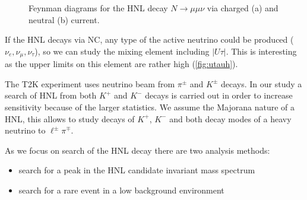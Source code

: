 \documentclass[../main.tex]{subfiles}
\begin{document}
\begin{figure}[!ht]
    \begin{minipage}[!ht]{0.49\linewidth}
    \end{minipage}
    \hfill
    \begin{minipage}[!ht]{0.49\linewidth}
    \end{minipage}
    \caption{Feynman diagrams for the HNL decay $N\to\mu\mu\nu$ via charged (a) and neutral (b) current.}
    \label{fig:DimuonFeynman}
\end{figure}

If the HNL decays via NC, any type of the active neutrino could be produced ($\nu_{e}, \nu_{\mu}, \nu_{\tau}$), so we can study the mixing element including $|U\tau|$. This is interesting as the upper limits on this element are rather high (\autoref{fig:utauh}).

The T2K experiment uses neutrino beam from $\pi^\pm$ and $K^\pm$ decays. In our study a search of HNL from both $K^+$ and $K^-$ decays is carried out in order to increase sensitivity because of the larger statistics. We assume the Majorana nature of a HNL, this allows to study decays of $K^+$, $K^-$ and both decay modes of a heavy neutrino to $\ell^{\pm}\pi^{\mp}$.

As we focus on search of the HNL decay there are two analysis methods:
\begin{itemize}
  \item search for a peak in the HNL candidate invariant mass spectrum
  \item search for a rare event in a low background environment
\end{itemize}
\end{document}
